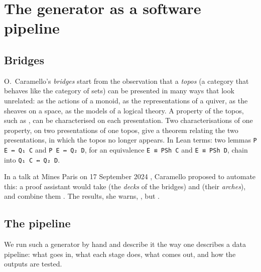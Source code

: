 \section{The generator as a software pipeline}\label{sec:intro}

\subsection{Bridges}

O.~Caramello's \emph{bridges} \cite{caramello-unification,caramello-tst} start from the observation that a \emph{topos} (a category that behaves like the category of sets) can be presented in many ways that look unrelated: as the actions of a monoid, as the representations of a quiver, as the sheaves on a space, as the models of a logical theory. A property of the topos, such as , can be characterised on each presentation. Two characterisations of one property, on two presentations of one topos, give a theorem relating the two presentations, in which the topos no longer appears. In Lean terms: two lemmas \texttt{P E ↔ Q₁ C} and \texttt{P E ↔ Q₂ D}, for an equivalence \texttt{E ≌ PSh C} and \texttt{E ≌ PSh D}, chain into \texttt{Q₁ C ↔ Q₂ D}.

In a talk at Mines Paris on 17 September 2024 \cite{caramello-mines}, Caramello proposed to automate this: a proof assistant would take  (the \emph{decks} of the bridges) and  (their \emph{arches}), and combine them  \cite[slide 11]{caramello-mines}. The results, she warns, , but  \cite[slide 8]{caramello-mines}.

\subsection{The pipeline}

We run such a generator by hand and describe it the way one describes a data pipeline: what goes in, what each stage does, what comes out, and how the outputs are tested.

